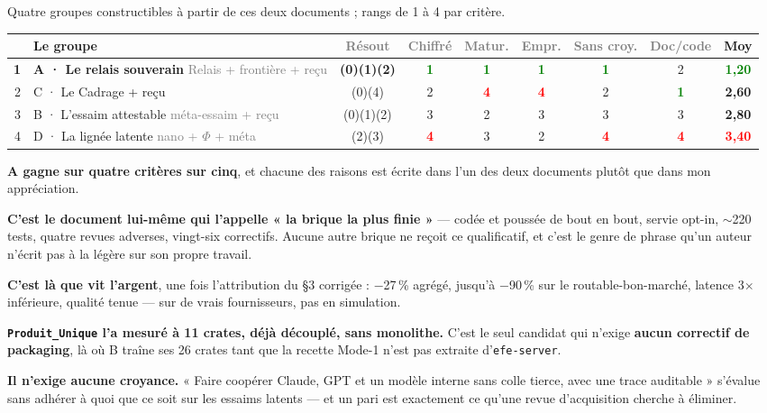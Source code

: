 \documentclass[10pt]{article}
\newcommand{\best}[1]{\textcolor{green}{\textbf{#1}}}
\newcommand{\pire}[1]{\textcolor{red}{\textbf{#1}}}
\newcommand{\sz}[1]{\textcolor{grey}{\small\textsf{#1}}}
\newcommand{\code}[1]{\texttt{\small #1}}
\newcommand{\x}{$\times$}
\newcommand{\pc}{\,\%}
\begin{document}
Quatre groupes constructibles à partir de ces deux documents ; rangs de 1 à 4 par critère.

\renewcommand{\arraystretch}{1.2}
\begin{center}\small
\begin{tabular}{@{}r >{\raggedright\arraybackslash}p{5.5cm} c ccccc c@{}}
\toprule
& \textbf{Le groupe} & \sz{Résout} & \sz{Chiffré} & \sz{Matur.} & \sz{Empr.} & \sz{Sans croy.} & \sz{Doc/code} & \textbf{Moy} \\
\midrule
\textbf{1} & \textbf{A · Le relais souverain} \sz{Relais + frontière + reçu} & \textbf{(0)(1)(2)} & \best{1} & \best{1} & \best{1} & \best{1} & 2 & \best{1,20} \\
2 & C · Le Cadrage + reçu & (0)(4) & 2 & \pire{4} & \pire{4} & 2 & \best{1} & \textbf{2,60} \\
3 & B · L'essaim attestable \sz{méta-essaim + reçu} & (0)(1)(2) & 3 & 2 & 3 & 3 & 3 & \textbf{2,80} \\
4 & D · La lignée latente \sz{nano + $\Phi$ + méta} & (2)(3) & \pire{4} & 3 & 2 & \pire{4} & \pire{4} & \pire{3,40} \\
\bottomrule
\end{tabular}
\end{center}

\textbf{A gagne sur quatre critères sur cinq}, et chacune des raisons est écrite dans l'un des deux
documents plutôt que dans mon appréciation.

\textbf{C'est le document lui-même qui l'appelle « la brique la plus finie »} --- codée et poussée de
bout en bout, servie opt-in, $\sim$220 tests, quatre revues adverses, vingt-six correctifs. Aucune autre
brique ne reçoit ce qualificatif, et c'est le genre de phrase qu'un auteur n'écrit pas à la légère sur
son propre travail.

\textbf{C'est là que vit l'argent}, une fois l'attribution du §3 corrigée : $-$27\pc{} agrégé, jusqu'à
$-$90\pc{} sur le routable-bon-marché, latence 3\x{} inférieure, qualité tenue --- sur de vrais
fournisseurs, pas en simulation.

\textbf{\code{Produit\_Unique} l'a mesuré à 11 crates, déjà découplé, sans monolithe.} C'est le seul
candidat qui n'exige \textbf{aucun correctif de packaging}, là où B traîne ses 26 crates tant que la
recette Mode-1 n'est pas extraite d'\code{efe-server}.

\textbf{Il n'exige aucune croyance.} « Faire coopérer Claude, GPT et un modèle interne sans colle
tierce, avec une trace auditable » s'évalue sans adhérer à quoi que ce soit sur les essaims latents ---
et un pari est exactement ce qu'une revue d'acquisition cherche à éliminer.
\end{document}
